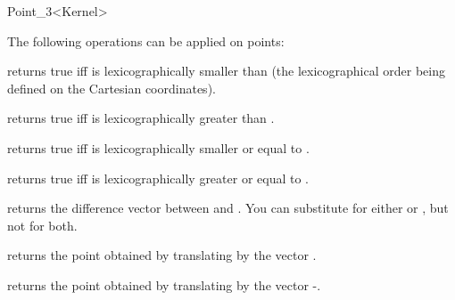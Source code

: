 \begin{ccRefClass} {Point_3<Kernel>}

The following operations can be applied on points:

       {returns true iff  is lexicographically smaller than 
       (the lexicographical order being defined on the Cartesian
       coordinates).}

       {returns true iff  is lexicographically greater than .}

       {returns true iff  is lexicographically smaller or equal to
.}

       {returns true iff  is lexicographically greater or equal to
.}

       {returns the difference vector between  and . 
        You can substitute  for either  or , 
        but not for both.}

       {returns the point obtained by translating  by the 
        vector .}

       {returns the point obtained by translating  by the 
        vector -.}

\ccSeeAlso


\end{ccRefClass} 

